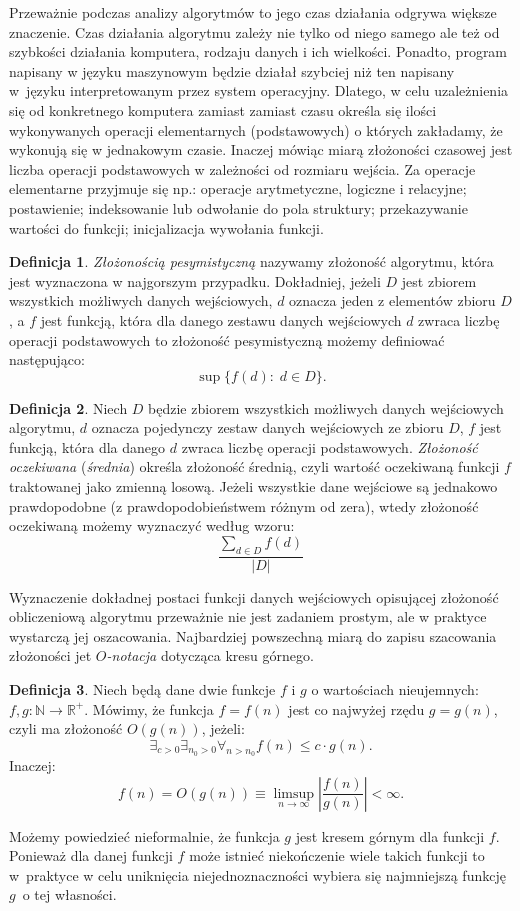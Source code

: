 \documentclass[12pt,a4paper]{book}
\theoremstyle{definition}
\newtheorem{de}{Definicja}[chapter]
\newcommand{\bR}{{\mathbb R}}
\newcommand{\bN}{{\mathbb N}}
\numberwithin{equation}{chapter}
\begin{document}
Przeważnie podczas analizy algorytmów to jego czas działania odgrywa większe znaczenie. Czas działania algorytmu zależy nie tylko od niego samego ale też od szybkości działania komputera, rodzaju danych i ich wielkości. Ponadto, program napisany w języku maszynowym będzie działał szybciej niż  ten napisany w~języku interpretowanym przez system operacyjny.  Dlatego, w celu uzależnienia się od konkretnego komputera zamiast zamiast czasu określa się ilości wykonywanych operacji elementarnych (podstawowych) o których zakładamy, że wykonują się w jednakowym czasie. Inaczej mówiąc miarą złożoności czasowej jest liczba operacji podstawowych w zależności od rozmiaru wejścia. Za operacje elementarne przyjmuje się np.: operacje arytmetyczne, logiczne i relacyjne; postawienie; indeksowanie lub odwołanie do pola struktury; przekazywanie wartości do funkcji; inicjalizacja wywołania funkcji.
\begin{de}
\textit{Złożonością pesymistyczną} nazywamy złożoność algorytmu, która jest wyznaczona w najgorszym przypadku. Dokładniej, jeżeli $D$ jest zbiorem wszystkich możliwych danych wejściowych, $d$ oznacza jeden z elementów zbioru $D$, a $f$ jest funkcją, która dla danego zestawu danych wejściowych $d$ zwraca liczbę operacji podstawowych to złożoność pesymistyczną możemy definiować następująco:
$$
\sup\{f(d)\colon\;d\in D\}.
$$
\end{de}
\begin{de}
Niech $D$ będzie zbiorem wszystkich możliwych danych wejściowych algorytmu, $d$ oznacza pojedynczy zestaw danych wejściowych ze zbioru $D$, $f$ jest funkcją, która dla danego $d$ zwraca liczbę operacji podstawowych. 
\textit{Złożoność oczekiwana} (\textit{średnia}) określa złożoność średnią, czyli wartość oczekiwaną funkcji $f$ traktowanej jako zmienną losową. Jeżeli wszystkie dane wejściowe są jednakowo prawdopodobne (z prawdopodobieństwem różnym od zera), wtedy złożoność oczekiwaną możemy wyznaczyć według wzoru:
$$
\frac{\displaystyle\sum_{d\in D}f(d)}{|D|}
$$
\end{de}

Wyznaczenie dokładnej postaci funkcji danych wejściowych opisującej złożoność obliczeniową algorytmu przeważnie nie jest zadaniem prostym, ale w praktyce wystarczą jej oszacowania. Najbardziej powszechną miarą do zapisu szacowania złożoności jet \textit{$O$-notacja} dotycząca kresu górnego.

\begin{de}
Niech będą dane dwie funkcje $f$ i $g$ o wartościach nieujemnych: $f,g\colon\bN\to\bR^{+}$. Mówimy, że funkcja $f = f(n)$ jest co najwyżej rzędu $g = g(n)$, czyli ma złożoność $O(g(n))$, jeżeli:
$$
\exists_{c>0}\exists_{n_0>0}\forall_{n>n_0} f(n)\leq c\cdot g(n).
$$
Inaczej:
$$
f(n) = O(g(n))\equiv\limsup_{n\to\infty}\left|\frac{f(n)}{g(n)}\right|<\infty.
$$
\end{de}
Możemy powiedzieć nieformalnie, że funkcja $g$ jest kresem górnym dla funkcji $f$. Ponieważ dla danej funkcji $f$ może istnieć niekończenie wiele takich funkcji to w~praktyce  w celu uniknięcia niejednoznaczności wybiera się najmniejszą funkcję $g$~o tej własności.
\end{document}
